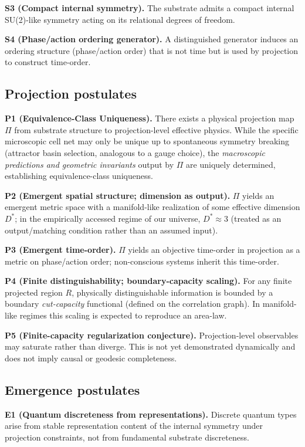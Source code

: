 \documentclass[reprint, amsmath, amssymb, aps, prd]{revtex4-2}
\begin{document}
\textbf{S3 (Compact internal symmetry).} The substrate admits a compact internal SU(2)-like symmetry acting on its relational degrees of freedom.  

\textbf{S4 (Phase/action ordering generator).} A distinguished generator induces an ordering structure (phase/action order) that is not time but is used by projection to construct time-order.

\subsection{Projection postulates}
\textbf{P1 (Equivalence-Class Uniqueness).} There exists a physical projection map $\Pi$ from substrate structure to projection-level effective physics. While the specific microscopic cell net may only be unique up to spontaneous symmetry breaking (attractor basin selection, analogous to a gauge choice), the \textit{macroscopic predictions and geometric invariants} output by $\Pi$ are uniquely determined, establishing equivalence-class uniqueness.

\textbf{P2 (Emergent spatial structure; dimension as output).} $\Pi$ yields an emergent metric space with a manifold-like realization of some effective dimension $D^*$; in the empirically accessed regime of our universe, $D^* \approx 3$ (treated as an output/matching condition rather than an assumed input).  

\textbf{P3 (Emergent time-order).} $\Pi$ yields an objective time-order in projection as a metric on phase/action order; non-conscious systems inherit this time-order.  

\textbf{P4 (Finite distinguishability; boundary-capacity scaling).} For any finite projected region $R$, physically distinguishable information is bounded by a boundary \textit{cut-capacity} functional (defined on the correlation graph). In manifold-like regimes this scaling is expected to reproduce an area-law.  

\textbf{P5 (Finite-capacity regularization conjecture).} Projection-level observables may saturate rather than diverge. This is not yet demonstrated dynamically and does not imply causal or geodesic completeness.

\subsection{Emergence postulates}
\textbf{E1 (Quantum discreteness from representations).} Discrete quantum types arise from stable representation content of the internal symmetry under projection constraints, not from fundamental substrate discreteness.  
\end{document}

